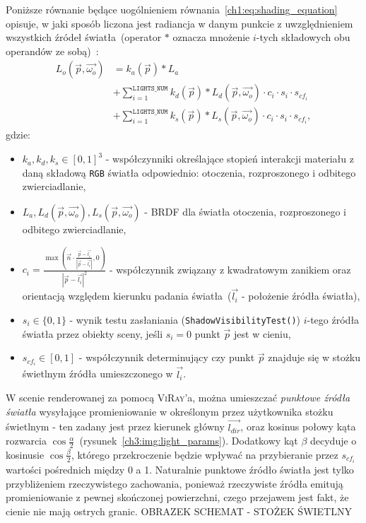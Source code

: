 \begin{enumerate}
Poniższe równanie będące uogólnieniem równania~\eqref{ch1:eq:shading_equation} opisuje, w jaki sposób liczona jest radiancja w danym punkcie z uwzględnieniem wszystkich źródeł światła~(operator $*$ oznacza mnożenie $i$-tych składowych obu operandów ze sobą)~\cite{RTFTGU}:
\begin{align}
L_o(\vec{p}, \vec{\omega_o}) &= k_a(\vec{p}) * L_a\nonumber\\
&+ \sum_{i=1}^{\mathtt{LIGHTS\_NUM}} k_d(\vec{p}) * L_d(\vec{p}, \vec{\omega_o}) \cdot c_i\cdot s_i\cdot s_{cf_i} \nonumber\\
&+ \sum_{i=1}^{\mathtt{LIGHTS\_NUM}} k_s(\vec{p}) * L_s(\vec{p}, \vec{\omega_o}) \cdot c_i\cdot s_i\cdot s_{cf_i},
\end{align}
gdzie:
\begin{itemize}
\item $k_a, k_d, k_s \in [0, 1]^3$ - współczynniki określające stopień interakcji materiału z daną składową \texttt{RGB} światła odpowiednio: otoczenia, rozproszonego i odbitego zwierciadlanie,
\item $L_a, L_d(\vec{p}, \vec{\omega_o}), L_s(\vec{p}, \vec{\omega_o})$ - BRDF dla światła otoczenia, rozproszonego i odbitego zwierciadlanie,
\item $c_i = \frac{\max\left(\vec{n} \cdot \frac{\vec{p} - \vec{l_i}}{|\vec{p} - \vec{l_i}|}  , 0\right)}{|\vec{p} - \vec{l_i}|^2} $ - współczynnik związany z kwadratowym zanikiem oraz orientacją względem kierunku padania światła~($\vec{l_i}$ - położenie źródła światła),
\item $s_i\in\lbrace 0, 1 \rbrace$ - wynik testu zasłaniania (\texttt{ShadowVisibilityTest()}) $i$-tego źródła światła przez obiekty sceny, jeśli $s_i=0$ punkt $\vec{p}$ jest w cieniu,
\item $s_{cf_i}\in[0, 1]$ - współczynnik determinujący czy punkt $\vec{p}$ znajduje się w stożku świetlnym źródła umieszczonego w $\vec{l_i}$.
\end{itemize}

W scenie renderowanej za pomocą \textsc{ViRay}'a, można umieszczać \textit{punktowe źródła światła} wysyłające promieniowanie w określonym przez użytkownika stożku świetlnym - ten zadany jest przez kierunek główny $\overrightarrow{l_{dir}}$, oraz kosinus połowy kąta rozwarcia $\cos \frac{\alpha}{2}$~(rysunek~\ref{ch3:img:light_params}). Dodatkowy kąt $\beta$ decyduje o kosinusie $\cos\frac{\beta}{2}$, którego przekroczenie będzie wpływać na przybieranie przez $s_{cf_i}$ wartości pośrednich między 0 a 1. Naturalnie punktowe źródło światła jest tylko przybliżeniem rzeczywistego zachowania, ponieważ rzeczywiste źródła emitują promieniowanie z pewnej skończonej powierzchni, czego przejawem jest fakt, że cienie nie mają ostrych granic. 
{\color{red}OBRAZEK SCHEMAT - STOŻEK ŚWIETLNY}


\end{enumerate}
